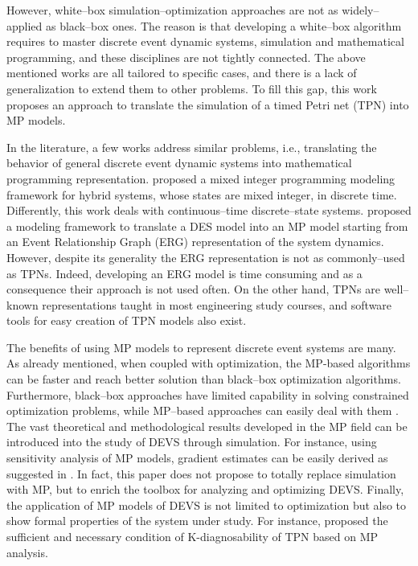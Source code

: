 \documentclass[suppldata]{interact}
\theoremstyle{plain}
\theoremstyle{definition}
\theoremstyle{remark}
\begin{document}
However, white--box simulation--optimization approaches are not as widely--applied as black--box ones. The reason is that developing a white--box algorithm requires %
to master discrete event dynamic systems, %
simulation and mathematical programming, %
and these disciplines are not tightly connected. The above mentioned works are all tailored to specific cases, and there is a lack of generalization to extend %
them to other problems. To fill this gap, this work proposes an approach to translate the simulation of a timed Petri net (TPN) into MP models.


In the literature, a few works address similar problems, i.e.,  translating the behavior of general discrete event dynamic systems into mathematical programming representation. \cite{bemporad1999control} proposed a mixed integer programming modeling framework for hybrid systems, whose states are mixed integer, in discrete time. Differently, this work deals with continuous--time discrete--state systems. \cite{chan2008optimization} proposed a modeling framework to translate a DES model into an MP model starting from an Event Relationship Graph (ERG) representation of the system dynamics. However, despite its generality the ERG representation is not as commonly--used as TPNs. Indeed, developing an ERG model is time consuming and %
as a consequence their approach is not used often. On the other hand, TPNs are well--known representations taught in most engineering study courses, and software tools for easy creation of TPN models also exist. 


The benefits of using MP models to represent discrete event systems are many. As already mentioned, %
when coupled with optimization, the MP-based algorithms can be faster and %
reach better solution than black--box optimization algorithms. Furthermore, black--box approaches have limited capability in solving constrained optimization problems, %
while MP--based approaches can easily deal with them \citep{zhang2020models}. The vast theoretical and methodological results developed in the MP field can be introduced into the study of DEVS through simulation. For instance, using sensitivity analysis of MP models, gradient estimates can be easily derived as suggested in \citep{chan2008optimization}. In fact, %
this paper does not propose to totally replace simulation with MP, but to enrich the toolbox for analyzing and optimizing DEVS. Finally, the application of MP models of DEVS is not limited to optimization but also to show formal properties of the system under study. For instance, \cite{basile2012k} proposed the sufficient and necessary condition of K-diagnosability of TPN based on MP analysis. 
\end{document}
